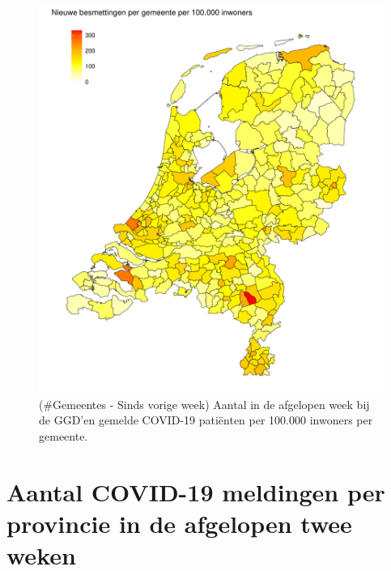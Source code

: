 \documentclass[
  english,
  man,floatsintext]{apa6}
\begin{document}
\begin{figure}
\centering
\includegraphics{daily_report_files/figure-latex/Gemeentes - Sinds vorige week-1.pdf}
\caption{(\#Gemeentes - Sinds vorige week) Aantal in de afgelopen week bij de GGD'en gemelde COVID-19 patiënten per 100.000 inwoners per gemeente.}
\end{figure}

\newpage

\hypertarget{aantal-covid-19-meldingen-per-provincie-in-de-afgelopen-twee-weken}{%
\section{Aantal COVID-19 meldingen per provincie in de afgelopen twee weken}\label{aantal-covid-19-meldingen-per-provincie-in-de-afgelopen-twee-weken}}
\end{document}
